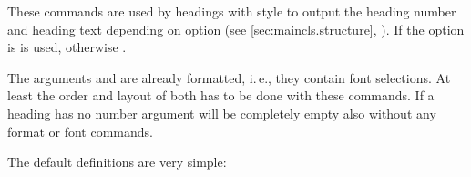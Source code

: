 \begin{Declaration}
\end{Declaration}
These commands are used
by headings with style  to output the heading number and
heading text depending on option
%
 (see \autoref{sec:maincls.structure},
). If the option is
  is used, otherwise
.

The arguments  and  are already formatted, i.\,e.,
they contain font selections. At least the order and layout of both has to be
done with these commands. If a heading has no number argument 
will be completely empty also without any format or font commands.

The default definitions are very simple:
\begin{lstcode}
  \newcommand{\chapterlinesformat}[3]{%
    \@hangfrom{#2}{#3}%
  }
  \newcommand{\chapterlineswithprefixformat}[3]{%
    #2#3%
  }
\end{lstcode}

